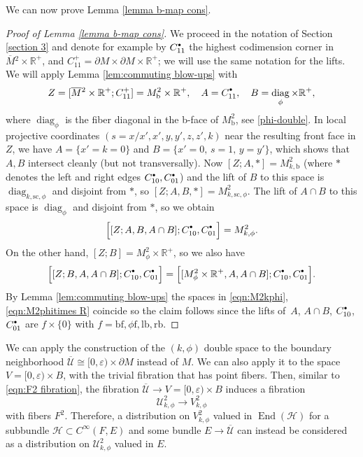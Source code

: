 \documentclass[11pt]{article}
\numberwithin{equation}{section}
\newcommand{\bbullet}{{\scriptscriptstyle\bullet}}
\newcommand{\sbullet}{{\raisebox{1pt}{$\bbullet$}}}
\theoremstyle{plain}
\theoremstyle{definition}
\newcommand{\R}{{\mathbb{R}}}
\newcommand{\Umath}{{\mathscr{U}}}
\newcommand{\Umathbar}{{\overline{\mathscr{U}}}}
\newcommand{\Hmath}{{\mathscr{H}}}
\newcommand{\phif}{{\phi\mathrm{f}}}
\newcommand{\lf}{{\mathrm{lb}}}
\newcommand{\rf}{{\mathrm{rb}}}
\newcommand{\bb}{{\mathrm{b}}}
\newcommand{\bbf}{{\mathrm{bf}}}
\newcommand{\ssc}{{\mathrm{sc}}}
\DeclareMathOperator\diag{diag}
\DeclareMathOperator{\End}{End}
\newcommand{\Cinf}{C^\infty}
\newcommand{\dM}{{\partial M}}
\newcommand{\Mbar}{{\overline{M}}}\let\M\Mbar
\let\eps\varepsilon
\begin{document}
We can now prove Lemma \ref{lemma b-map cons}.
\begin{proof} [Proof of Lemma \ref{lemma b-map cons}] We proceed in the notation of
Section \ref{section 3} and denote for example by $C_{11}^\sbullet$ the highest codimension corner in
$\Mbar{}^2 \times \R^+$, and $C_{11}^+ = \partial M\times\partial M\times \R^+$; we will use the same notation for the lifts.
We will apply
Lemma \ref{lem:commuting blow-ups} with
\[
Z=[\Mbar{}^2\times\R^+;C_{11}^+] = M^2_\bb\times\R^+, \quad
A=C_{11}^\sbullet, \quad B=\diag_\phi\times\R^+,
\]
where $\diag_\phi$ is the fiber diagonal in the b-face of $M^2_\bb$, see \eqref{phi-double}.
In local projective coordinates $(s=x/x', x', y,y',z,z',k)$ near the resulting front
face in $Z$, we have $A = \{x'=k=0\}$ and $B=\{x'=0,\, s=1,\, y=y'\}$, which shows that $A,B$ intersect cleanly {
(but not transversally).
Now $[Z;A,*]=M^2_{k,\bb}$ (where $*$ denotes the left and right edges $C_{10}^\sbullet,C_{01}^\sbullet$) and the lift of $B$ to this space is $\diag_{k,\ssc,\phi}$ and disjoint from $*$, so $[Z;A,B,*]= M^2_{k,\ssc,\phi}$. The lift of $A\cap B$ to this space is $\diag_\phi$ and disjoint from $*$, so we obtain}
\begin{equation}
\label{eqn:M2kphi}
\begin{split}
\Bigl[ [Z;A,B,A\cap B]; C_{10}^\sbullet,C_{01}^\sbullet\Bigr] = M^2_{k,\phi}.
\end{split}
\end{equation}
On the other hand, $[Z;B]=M^2_\phi\times\R^+$, so we also have
\begin{equation}
\label{eqn:M2phitimes R}
\Bigl[ [Z;B,A,A\cap B]; C_{10}^\sbullet,C_{01}^\sbullet\Bigr] = \Bigl[ [M^2_\phi \times \R^+,A,A\cap B]; C_{10}^\sbullet,C_{01}^\sbullet\Bigr].
\end{equation}
By Lemma \ref{lem:commuting blow-ups} the spaces in \eqref{eqn:M2kphi}, \eqref{eqn:M2phitimes R} coincide so the claim follows since the lifts of~$A$, $A\cap B$, $C_{10}^\sbullet$, $C_{01}^\sbullet$ are $f\times\{0\}$ with $f=\bbf, \phif, \lf,\rf$.
\end{proof}

We can apply the construction of the $(k,\phi)$ double space to the boundary neighborhood $\Umathbar\cong [0,\eps)\times\dM$ instead of $M$. We can also apply it to the space $V=[0,\eps)\times B$, with the trivial fibration that has point fibers. Then, similar to \eqref{eqn:F2 fibration}, the fibration $\Umathbar\to V=[0,\eps)\times B$ induces a fibration
\begin{equation}
\label{eqn:F2 fibration phi}
\Umath^2_{k,\phi} \to V^2_{k,\phi}
\end{equation}
with fibers $F^2$. Therefore, a distribution on $V^2_{k,\phi}$ valued in $\End(\Hmath)$ for a subbundle $\Hmath\subset \Cinf(F,E)$ and some bundle $E\to\Umathbar$ can instead be considered as a distribution on $\Umath^2_{k,\phi}$ valued in $E$.
\end{document}

